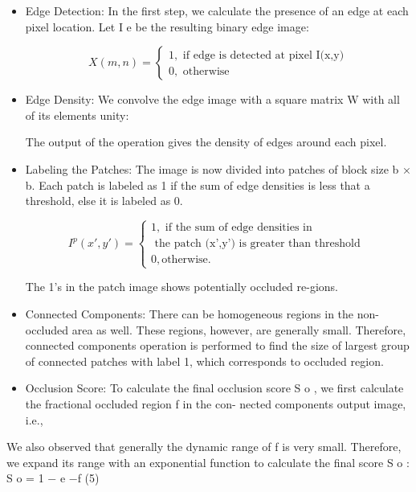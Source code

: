 \documentclass{sig-alternate}
\begin{document}
\begin{itemize}
    \item Edge Detection: In the first step, we calculate the presence of
an edge at each pixel location. Let I e be the resulting binary
edge image:

\begin{equation}
X(m,n)=\begin{cases}
1,\text{ if edge is detected at pixel I(x,y)}\\
0,\text{ otherwise}
\end{cases}
\end{equation}

    \item Edge Density: We convolve the edge image with a square
matrix W with all of its elements unity:

The output of the operation gives the density of edges around
each pixel.
    \item Labeling the Patches: The image is now divided into patches
of block size b × b. Each patch is labeled as 1 if the sum of
edge densities is less that a threshold, else it is labeled as 0.

\begin{equation}
I^p(x',y')=
\begin{cases}
1,\text{ if the sum of edge densities in}\\
	\text{   the patch (x',y') is greater than threshold }\\
0, \text{otherwise}. 
\end{cases}
\end{equation}

The 1’s in the patch image shows potentially occluded re-gions.
    \item Connected Components: There can be homogeneous regions
in the non-occluded area as well. These regions, however, are
generally small. Therefore, connected components operation
is performed to find the size of largest group of connected
patches with label 1, which corresponds to occluded region.
    \item Occlusion Score: To calculate the final occlusion score S o ,
we first calculate the fractional occluded region f in the con-
nected components output image, i.e.,
\end{itemize}

We also observed that generally the dynamic range of f is very
small. Therefore, we expand its range with an exponential function
to calculate the final score S o :
S o = 1 − e −f
(5)
\end{document}
